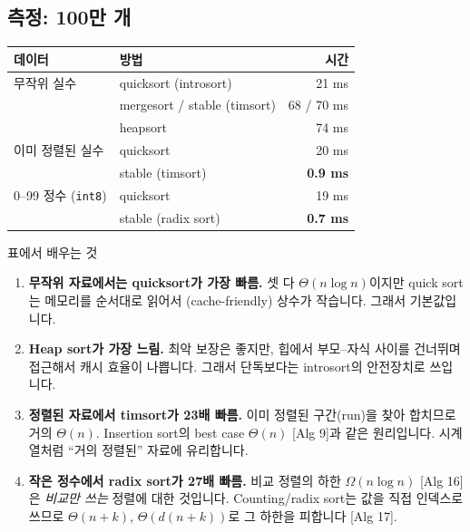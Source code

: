 \documentclass[11pt,a4paper]{article}
\newcommand{\code}[1]{\texttt{#1}}
\newcommand{\aref}[1]{{\footnotesize\textsf{\color{blue!55!black}[Alg #1]}}}
\begin{document}
\subsection{측정: 100만 개}
\begin{center}
\begin{tabular}{@{}l l r@{}}
\toprule
데이터 & 방법 & 시간 \\
\midrule
무작위 실수 & quicksort (introsort) & 21 ms \\
 & mergesort / stable (timsort) & 68 / 70 ms \\
 & heapsort & 74 ms \\
\midrule
이미 정렬된 실수 & quicksort & 20 ms \\
 & stable (timsort) & \textbf{0.9 ms} \\
\midrule
0–99 정수 (\code{int8}) & quicksort & 19 ms \\
 & stable (radix sort) & \textbf{0.7 ms} \\
\bottomrule
\end{tabular}
\end{center}

\begin{keybox}{표에서 배우는 것}
\begin{enumerate}
\item \textbf{무작위 자료에서는 quicksort가 가장 빠름.} 셋 다 $\Theta(n\log n)$이지만 quick sort는 메모리를 순서대로 읽어서 (cache-friendly) 상수가 작습니다. 그래서 기본값입니다.
\item \textbf{Heap sort가 가장 느림.} 최악 보장은 좋지만, 힙에서 부모–자식 사이를 건너뛰며 접근해서 캐시 효율이 나쁩니다. 그래서 단독보다는 introsort의 안전장치로 쓰입니다.
\item \textbf{정렬된 자료에서 timsort가 23배 빠름.} 이미 정렬된 구간(run)을 찾아 합치므로 거의 $\Theta(n)$. Insertion sort의 best case $\Theta(n)$ \aref{9}과 같은 원리입니다. 시계열처럼 ``거의 정렬된'' 자료에 유리합니다.
\item \textbf{작은 정수에서 radix sort가 27배 빠름.} 비교 정렬의 하한 $\Omega(n\log n)$ \aref{16}은 \emph{비교만 쓰는} 정렬에 대한 것입니다. Counting/radix sort는 값을 직접 인덱스로 쓰므로 $\Theta(n+k)$, $\Theta(d(n+k))$로 그 하한을 피합니다 \aref{17}.
\end{enumerate}
\end{keybox}
\end{document}

